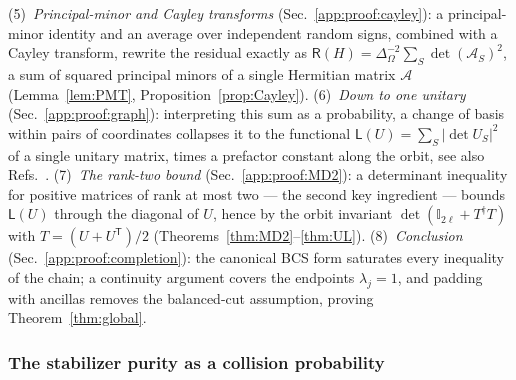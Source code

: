 \documentclass[prx,twocolumn,superscriptaddress,aps,10pt, frontmatterverbose, reprint,footinbib,longbibliography=true]{revtex4-2}
\newcommand{\trans}{\mathsf{T}}
\begin{document}
(5)~\emph{Principal-minor and Cayley transforms} (Sec.~\ref{app:proof:cayley}): a principal-minor identity and an average over independent random signs, combined with a Cayley transform, rewrite the residual exactly as $\mathsf{R}(H)=\Delta_\Omega^{-2}\sum_S\det(\mathcal{A}_S)^2$, a sum of squared principal minors of a single Hermitian matrix $\mathcal{A}$ (Lemma~\ref{lem:PMT}, Proposition~\ref{prop:Cayley}).
(6)~\emph{Down to one unitary} (Sec.~\ref{app:proof:graph}): interpreting this sum as a probability, a change of basis within pairs of coordinates collapses it to the functional $\mathsf{L}(U)=\sum_S|\det U_S|^2$ of a single unitary matrix, times a prefactor constant along the orbit, see also Refs.~\cite{collura2026nonstabilizernessfermionicgaussianstates,sfeo}.
(7)~\emph{The rank-two bound} (Sec.~\ref{app:proof:MD2}): a determinant inequality for positive matrices of rank at most two --- the second key ingredient --- bounds $\mathsf{L}(U)$ through the diagonal of $U$, hence by the orbit invariant $\det(\mathbb{I}_{2\ell}+T^\dagger T)$ with $T=(U+U^{\trans})/2$ (Theorems~\ref{thm:MD2}--\ref{thm:UL}).
(8)~\emph{Conclusion} (Sec.~\ref{app:proof:completion}): the canonical BCS form saturates every inequality of the chain; a continuity argument covers the endpoints $\lambda_j=1$, and padding with ancillas removes the balanced-cut assumption, proving Theorem~\ref{thm:global}.


\subsubsection{The stabilizer purity as a collision probability}
\label{app:proof:dpp}
\end{document}
